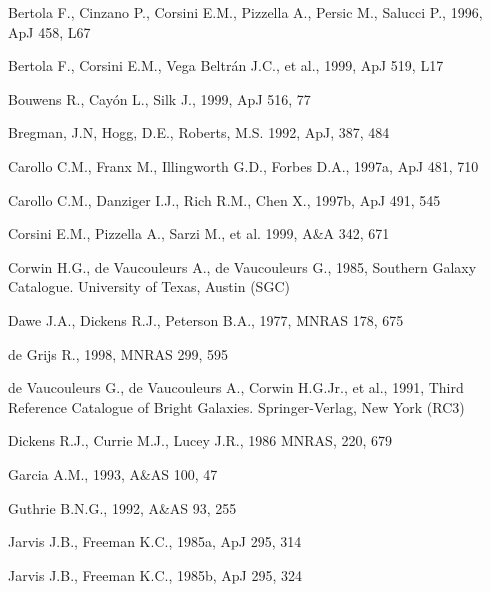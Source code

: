 \documentclass[twocolumns]{aa}
\begin{document}
\begin{thebibliography}{}
 Bertola F., Cinzano P., Corsini
  E.M., Pizzella A.,  Persic M., Salucci P., 1996, ApJ 458, L67

 Bertola F., Corsini E.M., 
  Vega Beltr\'an J.C., et al.,
  1999, ApJ 519, L17

 Bouwens R., Cay\'on L., Silk
  J., 1999, ApJ 516, 77

 Bregman, J.N, Hogg, D.E., 
  Roberts, M.S. 1992, ApJ, 387, 484

 Carollo C.M., Franx M., 
  Illingworth G.D., Forbes D.A., 1997a, ApJ 481, 710 

 Carollo C.M., Danziger I.J., 
  Rich R.M., Chen X., 1997b, ApJ 491, 545 

 Corsini E.M., Pizzella A., Sarzi M., 
  et al. 
  1999, A\&A 342, 671

 Corwin 
  H.G., de Vaucouleurs A., de Vaucouleurs G., 1985, Southern Galaxy 
  Catalogue. University of Texas, Austin (SGC)

 Dawe J.A., 
  Dickens R.J., Peterson B.A., 1977, MNRAS 178, 675 

 de Grijs R., 1998, MNRAS 299, 595 

 de Vaucouleurs G., 
  de Vaucouleurs A., Corwin H.G.Jr., et al.,
  1991, Third Reference Catalogue of Bright Galaxies. Springer-Verlag, 
  New York (RC3)

 Dickens R.J., 
  Currie M.J., Lucey J.R., 1986 MNRAS, 220, 679 

 Garcia A.M., 1993, A\&AS 100, 47 

 Guthrie B.N.G., 1992, A\&AS 93, 255

 Jarvis J.B., Freeman K.C., 
  1985a, ApJ 295, 314

 Jarvis J.B., Freeman K.C., 
  1985b, ApJ 295, 324


\end{thebibliography}
\end{document}
